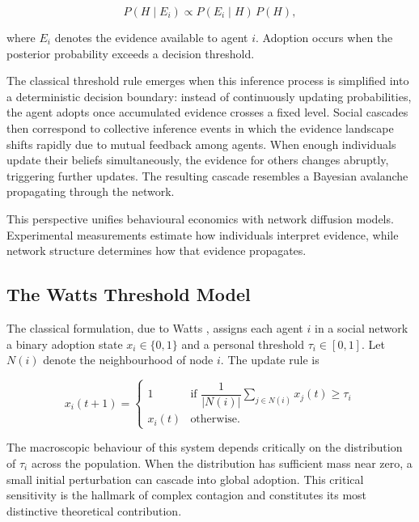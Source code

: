 \documentclass[12pt,a4paper]{article}
\theoremstyle{plain}
\theoremstyle{definition}
\begin{document}
\begin{equation}
P(H \mid E_i) \propto P(E_i \mid H)\,P(H),
\end{equation}

where $E_i$ denotes the evidence available to agent $i$. Adoption occurs when the posterior probability exceeds a decision threshold.

The classical threshold rule emerges when this inference process is simplified into a deterministic decision boundary: instead of continuously updating probabilities, the agent adopts once accumulated evidence crosses a fixed level. Social cascades then correspond to collective inference events in which the evidence landscape shifts rapidly due to mutual feedback among agents. When enough individuals update their beliefs simultaneously, the evidence for others changes abruptly, triggering further updates. The resulting cascade resembles a Bayesian avalanche propagating through the network.

This perspective unifies behavioural economics with network diffusion models. Experimental measurements estimate how individuals interpret evidence, while network structure determines how that evidence propagates.

\subsection{The Watts Threshold Model}

The classical formulation, due to Watts \cite{Watts2002}, assigns each agent $i$ in a social network a binary adoption state $x_i \in \{0,1\}$ and a personal threshold $\tau_i \in [0,1]$. Let $N(i)$ denote the neighbourhood of node $i$. The update rule is

\begin{equation}
x_i(t+1) =
\begin{cases}
1 & \text{if } \dfrac{1}{|N(i)|}\displaystyle\sum_{j \in N(i)} x_j(t) \geq \tau_i \\
x_i(t) & \text{otherwise.}
\end{cases}
\end{equation}

The macroscopic behaviour of this system depends critically on the distribution of $\tau_i$ across the population. When the distribution has sufficient mass near zero, a small initial perturbation can cascade into global adoption. This critical sensitivity is the hallmark of complex contagion and constitutes its most distinctive theoretical contribution.
\end{document}
